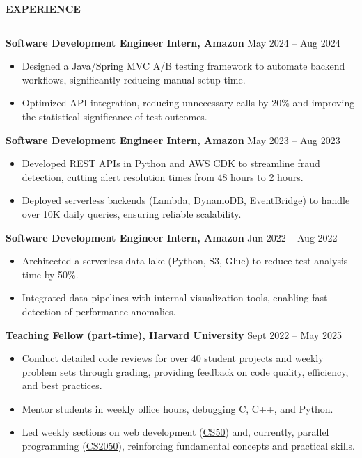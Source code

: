 \documentclass[11pt,a4paper]{article}
\newcommand{\sectionheading}[1]{\vspace{0.2cm}\textbf{\Large #1}\vspace{0.1cm}\hrule\vspace{0.3cm}}
\newcommand{\daterange}[1]{\hfill{#1}}
\begin{document}
\sectionheading{EXPERIENCE}

\textbf{Software Development Engineer Intern, Amazon} \hfill \daterange{May 2024 -- Aug 2024}
\begin{itemize}[leftmargin=*,nosep]
    \item Designed a Java/Spring MVC A/B testing framework to automate backend workflows, significantly reducing manual setup time.
    \item Optimized API integration, reducing unnecessary calls by 20\% and improving the statistical significance of test outcomes.
\end{itemize}

\textbf{Software Development Engineer Intern, Amazon} \hfill \daterange{May 2023 -- Aug 2023}
\begin{itemize}[leftmargin=*,nosep]
    \item Developed REST APIs in Python and AWS CDK to streamline fraud detection, cutting alert resolution times from 48 hours to 2 hours.
    \item Deployed serverless backends (Lambda, DynamoDB, EventBridge) to handle over 10K daily queries, ensuring reliable scalability.
\end{itemize}

\textbf{Software Development Engineer Intern, Amazon} \hfill \daterange{Jun 2022 -- Aug 2022}
\begin{itemize}[leftmargin=*,nosep]
    \item Architected a serverless data lake (Python, S3, Glue) to reduce test analysis time by 50\%.
    \item Integrated data pipelines with internal visualization tools, enabling fast detection of performance anomalies.
\end{itemize}

\medskip
\textbf{Teaching Fellow (part-time), Harvard University} \hfill \daterange{Sept 2022 -- May 2025}
\begin{itemize}[leftmargin=*,nosep]
    \item Conduct detailed code reviews for over 40 student projects and weekly problem sets through grading, providing feedback on code quality, efficiency, and best practices.
    \item Mentor students in weekly office hours, debugging C, C++, and Python.
    \item Led weekly sections on web development (\href{https://cs50.harvard.edu/college/2023/fall/}{CS50}) and, currently, parallel programming (\href{https://sites.google.com/g.harvard.edu/cs-2050/syllabus}{CS2050}), reinforcing fundamental concepts and practical skills.
\end{itemize}
\end{document}
